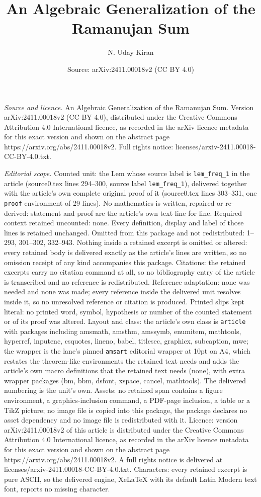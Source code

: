 \documentclass[10pt,a4paper]{amsart}
\title[An Algebraic Generalization of the Ramanujan Sum]{An Algebraic Generalization of the Ramanujan Sum}
\author{N. Uday Kiran}
\date{Source: arXiv:2411.00018v2 (CC BY 4.0)}
\begin{document}
\maketitle

\noindent\emph{Source and licence.} An Algebraic Generalization of the Ramanujan Sum. Version arXiv:2411.00018v2 (CC BY 4.0), distributed under the Creative Commons Attribution 4.0 International licence, as recorded in the arXiv licence metadata for this exact version and shown on the abstract page https://arxiv.org/abs/2411.00018v2. Full rights notice: licenses/arxiv-2411.00018-CC-BY-4.0.txt.\par\smallskip

\noindent\textit{Editorial scope.} Counted unit: the Lem whose source label is \texttt{lem\_freq\_1} in the article (source0.tex lines 294--300, source label \texttt{lem\_freq\_1}), delivered together with the article's own complete original proof of it (source0.tex lines 303--331, one \texttt{proof} environment of 29 lines). No mathematics is written, repaired or re-derived: statement and proof are the article's own text line for line. Required context retained uncounted: none. Every definition, display and label of those lines is retained unchanged. Omitted from this package and not redistributed: 1--293, 301--302, 332--943. Nothing inside a retained excerpt is omitted or altered: every retained body is delivered exactly as the article's lines are written, so no omission receipt of any kind accompanies this package. Citations: the retained excerpts carry no citation command at all, so no bibliography entry of the article is transcribed and no reference is redistributed. Reference adaptation: none was needed and none was made; every reference inside the delivered unit resolves inside it, so no unresolved reference or citation is produced. Printed slips kept literal: no printed word, symbol, hypothesis or number of the counted statement or of its proof was altered. Layout and class: the article's own class is \texttt{article} with packages including amsmath, amsthm, amssymb, enumitem, mathtools, hyperref, inputenc, csquotes, lineno, babel, titlesec, graphicx, subcaption, mwe; the wrapper is the lane's pinned \texttt{amsart} editorial wrapper at 10pt on A4, which restates the theorem-like environments the retained text needs and adds the article's own macro definitions that the retained text needs (none), with extra wrapper packages (bm, bbm, dsfont, xspace, cancel, mathtools). The delivered numbering is the unit's own. Assets: no retained span contains a figure environment, a graphics-inclusion command, a PDF-page inclusion, a table or a TikZ picture; no image file is copied into this package, the package declares no asset dependency and no image file is redistributed with it. Licence: version arXiv:2411.00018v2 of this article is distributed under the Creative Commons Attribution 4.0 International licence, as recorded in the arXiv licence metadata for this exact version and shown on the abstract page https://arxiv.org/abs/2411.00018v2. A full rights notice is delivered at licenses/arxiv-2411.00018-CC-BY-4.0.txt. Characters: every retained excerpt is pure ASCII, so the delivered engine, XeLaTeX with its default Latin Modern text font, reports no missing character.
\end{document}
